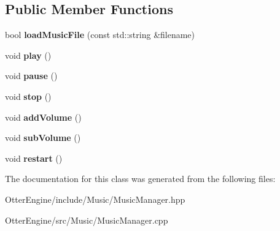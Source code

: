 \subsection*{Public Member Functions}
\begin{DoxyCompactItemize}
\item 
bool {\bfseries load\+Music\+File} (const std\+::string \&filename)\hypertarget{class_music_manager_a43058e946b9c02d757d4159b9128a1c0}{}\label{class_music_manager_a43058e946b9c02d757d4159b9128a1c0}

\item 
void {\bfseries play} ()\hypertarget{class_music_manager_ab9e5a12ee9028b69e1334d49527f4ab6}{}\label{class_music_manager_ab9e5a12ee9028b69e1334d49527f4ab6}

\item 
void {\bfseries pause} ()\hypertarget{class_music_manager_afae69d6f2c1297edeea90c2420023d86}{}\label{class_music_manager_afae69d6f2c1297edeea90c2420023d86}

\item 
void {\bfseries stop} ()\hypertarget{class_music_manager_a05bdad83d854e8f8b5a0a5328f110e16}{}\label{class_music_manager_a05bdad83d854e8f8b5a0a5328f110e16}

\item 
void {\bfseries add\+Volume} ()\hypertarget{class_music_manager_aba5df19294be9873ec6e410d4d9ca031}{}\label{class_music_manager_aba5df19294be9873ec6e410d4d9ca031}

\item 
void {\bfseries sub\+Volume} ()\hypertarget{class_music_manager_a5abd376720f9b6ebc36fb21bafae3fdc}{}\label{class_music_manager_a5abd376720f9b6ebc36fb21bafae3fdc}

\item 
void {\bfseries restart} ()\hypertarget{class_music_manager_aaf0d57cdc27c46a25078988fc3a366bc}{}\label{class_music_manager_aaf0d57cdc27c46a25078988fc3a366bc}

\end{DoxyCompactItemize}


The documentation for this class was generated from the following files\+:\begin{DoxyCompactItemize}
\item 
Otter\+Engine/include/\+Music/Music\+Manager.\+hpp\item 
Otter\+Engine/src/\+Music/Music\+Manager.\+cpp\end{DoxyCompactItemize}
